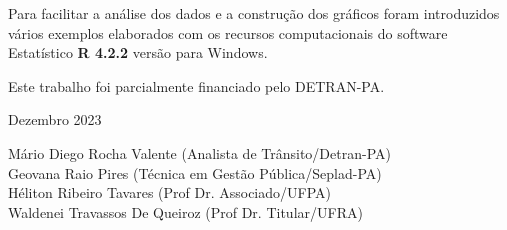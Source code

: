 Para facilitar a análise dos dados e a construção dos gráficos foram introduzidos vários exemplos elaborados com os recursos computacionais do software Estatístico \textbf{R 4.2.2} versão para Windows. 
\vst

Este trabalho foi parcialmente financiado pelo DETRAN-PA.

\vst

\begin{centering}

\vst

Dezembro 2023 
\vsm

Mário Diego Rocha Valente (Analista de Trânsito/Detran-PA) \\

Geovana Raio Pires (Técnica em Gestão Pública/Seplad-PA)\\

Héliton Ribeiro Tavares (Prof Dr. Associado/UFPA)\\

Waldenei Travassos De Queiroz (Prof Dr. Titular/UFRA)\\



\end{centering}
